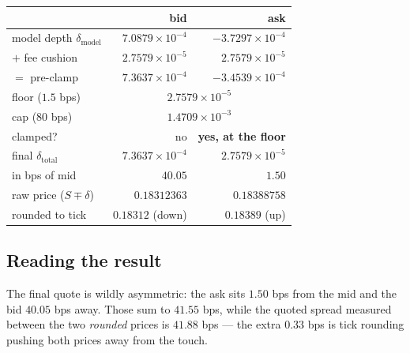 \documentclass[11pt,a4paper]{article}
\begin{document}
\begin{center}\small
\begin{tabular}{@{}lrr@{}}
\toprule
& \textbf{bid} & \textbf{ask} \\
\midrule
model depth $\delta_{\text{model}}$ & $7.0879\times10^{-4}$ & $-3.7297\times10^{-4}$ \\
$+$ fee cushion & $2.7579\times10^{-5}$ & $2.7579\times10^{-5}$ \\
$=$ pre-clamp & $7.3637\times10^{-4}$ & $-3.4539\times10^{-4}$ \\
\midrule
floor ($1.5$ bps) & \multicolumn{2}{c}{$2.7579\times10^{-5}$} \\
cap ($80$ bps) & \multicolumn{2}{c}{$1.4709\times10^{-3}$} \\
clamped? & no & \textbf{yes, at the floor} \\
\midrule
final $\delta_{\text{total}}$ & $7.3637\times10^{-4}$ & $2.7579\times10^{-5}$ \\
in bps of mid & $40.05$ & $1.50$ \\
\midrule
raw price ($S \mp \delta$) & $0.18312363$ & $0.18388758$ \\
rounded to tick & $0.18312$ (down) & $0.18389$ (up) \\
\bottomrule
\end{tabular}
\end{center}

\subsection{Reading the result}

The final quote is wildly asymmetric: the ask sits $1.50$ bps from the mid and
the bid $40.05$ bps away. Those sum to $41.55$ bps, while the quoted spread
measured between the two \emph{rounded} prices is $41.88$ bps --- the extra
$0.33$ bps is tick rounding pushing both prices away from the touch.
\end{document}
